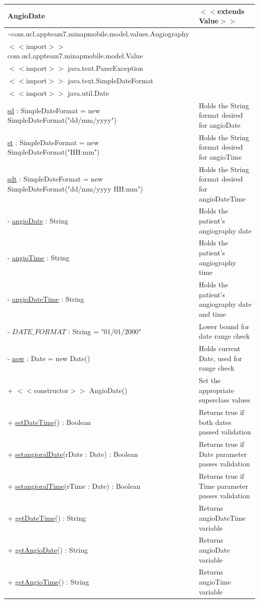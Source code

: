 \documentclass[12pt,a4paper,oneside,titlepage]{article}
\begin{document}
\begin{center}
	\begin{tabular}{| p{13cm} | p{5cm} |}
	\hline
	\textbf{AngioDate} & \textbf{$<<$extends Value$>>$} \\ \hline
	\textasciitilde com.ucl.appteam7.minapmobile.model.values.Angiography & \\ \hline
	$<<$import$>>$ com.ucl.appteam7.minapmobile.model.Value & \\ \hline
	$<<$import$>>$ java.text.ParseException & \\ \hline
	$<<$import$>>$ java.text.SimpleDateFormat & \\ \hline
	$<<$import$>>$ java.util.Date & \\ \hline \hline
	\underline{sd} : SimpleDateFormat = new SimpleDateFormat("dd/mm/yyyy") & Holds the String format desired for angioDate \\ \hline
	\underline{st} : SimpleDateFormat = new SimpleDateFormat("HH:mm") & Holds the String format desired for angioTime \\ \hline
	\underline{sdt} : SimpleDateFormat = new SimpleDateFormat("dd/mm/yyyy HH:mm") & Holds the String format desired for angioDateTime \\ \hline
	- \underline{angioDate} : String & Holds the patient's angiography date \\ \hline
	- \underline{angioTime} : String & Holds the patient's angiography time \\ \hline
	- \underline{angioDateTime} : String & Holds the patient's angiography date and time \\ \hline
	- \underline{$DATE\_FORMAT$} : String = "01/01/2000" & Lower bound for date range check \\ \hline
	- \underline{now} : Date = new Date() & Holds current Date, used for range check \\ \hline \hline
	+ $<<$constructor$>>$ AngioDate() & Set the appropriate superclass values \\ \hline
	+ \underline{setDateTime}() : Boolean & Returns true if both dates passed validation \\ \hline
	+ \underline{setangioralDate}(rDate : Date) : Boolean & Returns true if Date parameter passes validation \\ \hline
	+ \underline{setangioralTime}(rTime : Date) : Boolean & Returns true if Time parameter passes validation \\ \hline
	+ \underline{getDateTime}() : String & Returns angioDateTime variable \\ \hline
	+ \underline{getAngioDate}() : String & Returns angioDate variable \\ \hline
	+ \underline{getAngioTime}() : String & Returns angioTime variable \\ \hline
	\end{tabular}
\end{center}
\end{document}
